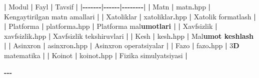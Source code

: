 \documentclass[a4paper,11pt,twoside,openright]{book}
\newenvironment{Shaded}{\begin{snugshade}}{\end{snugshade}}
\newcommand{\CharTok}[1]{\textcolor[rgb]{0.31,0.60,0.02}{#1}}
\newcommand{\DecValTok}[1]{\textcolor[rgb]{0.00,0.00,0.81}{#1}}
\newcommand{\ErrorTok}[1]{\textcolor[rgb]{0.64,0.00,0.00}{\textbf{#1}}}
\newcommand{\NormalTok}[1]{#1}
\newcommand{\OperatorTok}[1]{\textcolor[rgb]{0.81,0.36,0.00}{\textbf{#1}}}
\begin{document}
\begin{Shaded}
\begin{Highlighting}[]
\OperatorTok{|}\NormalTok{ Modul }\OperatorTok{|}\NormalTok{ Fayl }\OperatorTok{|}\NormalTok{ Tavsif }\OperatorTok{|}
\OperatorTok{|{-}{-}{-}{-}{-}{-}{-}|{-}{-}{-}{-}{-}{-}|{-}{-}{-}{-}{-}{-}{-}{-}|}
\OperatorTok{|} \ErrorTok{\textasciigrave{}}\NormalTok{Matn}\ErrorTok{\textasciigrave{}} \OperatorTok{|} \ErrorTok{\textasciigrave{}}\NormalTok{matn}\OperatorTok{.}\NormalTok{hpp}\ErrorTok{\textasciigrave{}} \OperatorTok{|}\NormalTok{ Kengaytirilgan matn amallari }\OperatorTok{|}
\OperatorTok{|} \ErrorTok{\textasciigrave{}}\NormalTok{Xatoliklar}\ErrorTok{\textasciigrave{}} \OperatorTok{|} \ErrorTok{\textasciigrave{}}\NormalTok{xatoliklar}\OperatorTok{.}\NormalTok{hpp}\ErrorTok{\textasciigrave{}} \OperatorTok{|}\NormalTok{ Xatolik formatlash }\OperatorTok{|}
\OperatorTok{|} \ErrorTok{\textasciigrave{}}\NormalTok{Platforma}\ErrorTok{\textasciigrave{}} \OperatorTok{|} \ErrorTok{\textasciigrave{}}\NormalTok{platforma}\OperatorTok{.}\NormalTok{hpp}\ErrorTok{\textasciigrave{}} \OperatorTok{|}\NormalTok{ Platforma ma}\CharTok{\textquotesingle{}l}\ErrorTok{umotlari |}
\OperatorTok{|} \ErrorTok{\textasciigrave{}}\NormalTok{Xavfsizlik}\ErrorTok{\textasciigrave{}} \OperatorTok{|} \ErrorTok{\textasciigrave{}}\NormalTok{xavfsizlik}\OperatorTok{.}\NormalTok{hpp}\ErrorTok{\textasciigrave{}} \OperatorTok{|}\NormalTok{ Xavfsizlik tekshiruvlari }\OperatorTok{|}
\OperatorTok{|} \ErrorTok{\textasciigrave{}}\NormalTok{Kesh}\ErrorTok{\textasciigrave{}} \OperatorTok{|} \ErrorTok{\textasciigrave{}}\NormalTok{kesh}\OperatorTok{.}\NormalTok{hpp}\ErrorTok{\textasciigrave{}} \OperatorTok{|}\NormalTok{ Ma}\CharTok{\textquotesingle{}l}\ErrorTok{umot keshlash |}
\OperatorTok{|} \ErrorTok{\textasciigrave{}}\NormalTok{Asinxron}\ErrorTok{\textasciigrave{}} \OperatorTok{|} \ErrorTok{\textasciigrave{}}\NormalTok{asinxron}\OperatorTok{.}\NormalTok{hpp}\ErrorTok{\textasciigrave{}} \OperatorTok{|}\NormalTok{ Asinxron operatsiyalar }\OperatorTok{|}
\OperatorTok{|} \ErrorTok{\textasciigrave{}}\NormalTok{Fazo}\ErrorTok{\textasciigrave{}} \OperatorTok{|} \ErrorTok{\textasciigrave{}}\NormalTok{fazo}\OperatorTok{.}\NormalTok{hpp}\ErrorTok{\textasciigrave{}} \OperatorTok{|} \DecValTok{3}\ErrorTok{D}\NormalTok{ matematika }\OperatorTok{|}
\OperatorTok{|} \ErrorTok{\textasciigrave{}}\NormalTok{Koinot}\ErrorTok{\textasciigrave{}} \OperatorTok{|} \ErrorTok{\textasciigrave{}}\NormalTok{koinot}\OperatorTok{.}\NormalTok{hpp}\ErrorTok{\textasciigrave{}} \OperatorTok{|}\NormalTok{ Fizika simulyatsiyasi }\OperatorTok{|}

\OperatorTok{{-}{-}{-}}


\end{Highlighting}
\end{Shaded}
\end{document}
